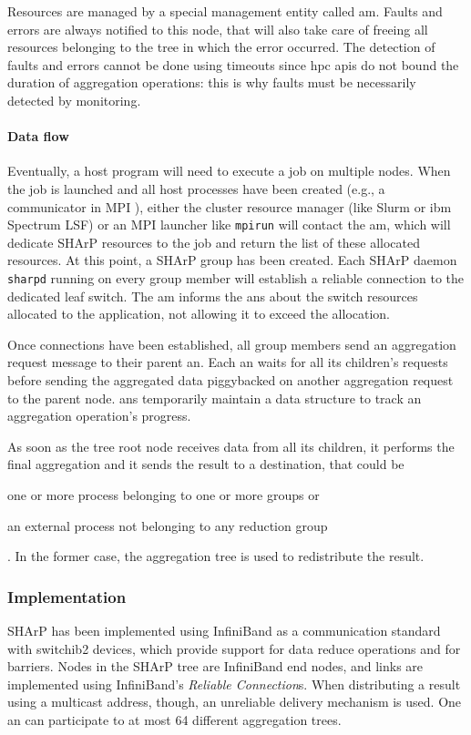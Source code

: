 Resources are managed by a special management entity called \gls{am}.
Faults and errors are always notified to this node, that will also take care of freeing all resources belonging to the tree in which the error occurred.
The detection of faults and errors cannot be done using timeouts since \gls{hpc} \glspl{api} do not bound the duration of aggregation operations: this is why faults must be necessarily detected by monitoring.

\paragraph{Data flow}
Eventually, a host program will need to execute a job on multiple nodes.
When the job is launched and all host processes have been created (e.g., a communicator in MPI \cite{mpi}), either the cluster resource manager (like Slurm \cite{slurm} or \glsdesc{ibm} Spectrum LSF) or an MPI \cite{mpi} launcher like \texttt{mpirun} will contact the \gls{am}, which will dedicate SHArP \cite{sharp} resources to the job and return the list of these allocated resources.
At this point, a SHArP \cite{sharp} group has been created.
Each SHArP \cite{sharp} daemon \texttt{sharpd} running on every group member will establish a reliable connection to the dedicated leaf switch.
The \gls{am} informs the \glspl{an} about the switch resources allocated to the application, not allowing it to exceed the allocation.\par
Once connections have been established, all group members send an aggregation request message to their parent \gls{an}.
Each \gls{an} waits for all its children's requests before sending the aggregated data piggybacked on another aggregation request to the parent node.
\glspl{an} temporarily maintain a data structure to track an aggregation operation's progress.\par
As soon as the tree root node receives data from all its children, it performs the final aggregation and it sends the result to a destination, that could be
\begin{mylist}
    \item one or more process belonging to one or more groups or
    \item an external process not belonging to any reduction group
\end{mylist}.
In the former case, the aggregation tree is used to redistribute the result.

\subsubsection{Implementation}
SHArP \cite{sharp} has been implemented using InfiniBand \cite{infiniband} as a communication standard with \glsdesc{switchib2} devices, which provide support for data reduce operations and for barriers.
Nodes in the SHArP \cite{sharp} tree are InfiniBand \cite{infiniband} end nodes, and links are implemented using InfiniBand's \cite{infiniband} \textit{Reliable Connection}s.
When distributing a result using a multicast address, though, an unreliable delivery mechanism is used.
One \gls{an} can participate to at most 64 different aggregation trees.

